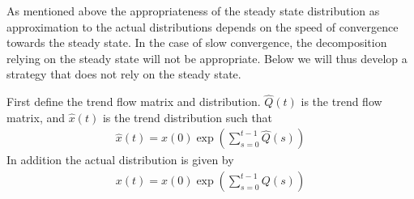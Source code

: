 As mentioned above the appropriateness of the steady state distribution as approximation to the actual distributions depends on the speed of convergence towards the steady state. In the case of slow convergence, the decomposition relying on the steady state will not be appropriate. Below we will thus develop a strategy that does not rely on the steady state.

First define the trend flow matrix and distribution. $\hat{Q}(t)$ is the trend flow matrix, and $\hat{x}(t)$ is the trend distribution such that
\begin{align}
\hat{x}(t)=x(0) \exp \left( \sum_{s=0}^{t-1} \hat{Q}(s) \right)
\end{align}
In addition the actual distribution is given by 
\begin{align}
x(t)=x(0) \exp \left( \sum_{s=0}^{t-1} {Q}(s) \right)
\end{align}


